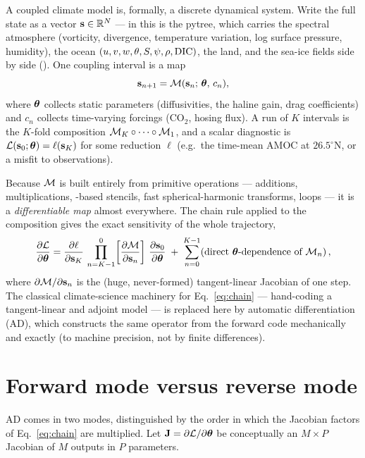 A coupled climate model is, formally, a discrete dynamical system. Write the full state as a
vector $\mathbf{s}\in\mathbb{R}^{N}$ --- in \model{} this is the  pytree,
which carries the \dino{} spectral atmosphere \citep{dinosaur_software} (vorticity, divergence,
temperature variation, log surface pressure, humidity), the ocean $(u,v,w,\theta,S,\psi,\rho,\mathrm{DIC})$,
the land, and the sea-ice fields side by side
(). One coupling interval is
a map
\begin{equation}
  \mathbf{s}_{n+1} = \mathcal{M}(\mathbf{s}_n;\,\boldsymbol{\theta},\,c_n),
  \label{eq:step}
\end{equation}
where $\boldsymbol{\theta}$ collects static parameters (diffusivities, the haline gain, drag coefficients) and
$c_n$ collects time-varying forcings (CO$_2$, hosing flux). A run of $K$ intervals is the
$K$-fold composition $\mathcal{M}_K\circ\cdots\circ\mathcal{M}_1$, and a scalar diagnostic is
$\mathcal{L}(\mathbf{s}_0;\boldsymbol{\theta})=\ell(\mathbf{s}_K)$ for some reduction $\ell$ (e.g.\ the time-mean AMOC at
$26.5^\circ$N, or a misfit to observations).

Because $\mathcal{M}$ is built entirely from primitive \jax{} operations --- additions, multiplications,
-based stencils, fast spherical-harmonic transforms,  loops --- it is a
\emph{differentiable map} almost everywhere. The chain rule applied to the composition gives the
exact sensitivity of the whole trajectory,
\begin{equation}
  \frac{\partial \mathcal{L}}{\partial \boldsymbol{\theta}}
  = \frac{\partial \ell}{\partial \mathbf{s}_K}\,
    \prod_{n=K-1}^{0}\!\left[ \frac{\partial \mathcal{M}}{\partial \mathbf{s}_n}\right]\,\frac{\partial \mathbf{s}_0}{\partial \boldsymbol{\theta}}
  \;+\;
  \sum_{n=0}^{K-1}\!\left(\text{direct }\boldsymbol{\theta}\text{-dependence of }\mathcal{M}_n\right),
  \label{eq:chain}
\end{equation}
where $\partial\mathcal{M}/\partial\mathbf{s}_n$ is the (huge, never-formed) tangent-linear Jacobian of one
step. The classical climate-science machinery for Eq.~\eqref{eq:chain} --- hand-coding a
tangent-linear and adjoint model --- is replaced here by automatic differentiation (AD), which
constructs the same operator from the forward code mechanically and exactly (to machine precision,
not by finite differences).

\section{Forward mode versus reverse mode}

AD comes in two modes, distinguished by the order in which the Jacobian factors of
Eq.~\eqref{eq:chain} are multiplied. Let $\mathbf{J}=\partial\mathcal{L}/\partial\boldsymbol{\theta}$ be conceptually an
$M\times P$ Jacobian of $M$ outputs in $P$ parameters.

